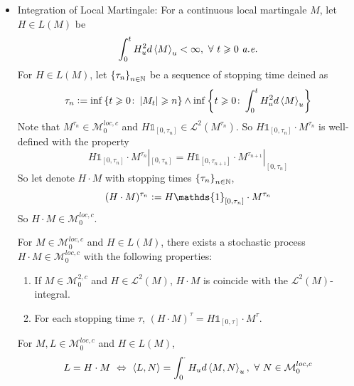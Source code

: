 \documentclass[a4paper,12pt]{article}
\begin{document}
\begin{itemize}
  \item Integration of Local Martingale: For a continuous local martingale $M$, let $H \in L(M)$ be
  \begin{equation*}
    \int_0^tH_u^2 d\left\langle M \right\rangle_u < \infty,~\forall~t\geqslant 0~\emph{a.e.}
  \end{equation*}
  For $H \in L(M)$, let $\left\{\tau_n\right\}_{n \in \mathbb{N}}$ be a sequence of stopping time deined as
  \begin{equation*}
    \tau_n \vcentcolon= \inf\left\{t \geqslant 0 \colon \left\lvert M_t\right\lvert \geqslant n\right\} \wedge \inf\left\{t \geqslant 0 \colon \int_0^t H_u^2 d\left\langle M \right\rangle_u\right\}
  \end{equation*}
  Note that $M^{\tau_n} \in \mathcal{M}_0^{loc,c}$ and $H\mathds{1}_{[0,\tau_n]} \in \mathcal{L}^2(M^{\tau_n})$. So $H\mathds{1}_{[0,\tau_n]} \cdot M^{\tau_n}$ is well-defined with the property
  \begin{equation*}
    H\mathds{1}_{[0,\tau_n]} \cdot M^{\tau_n}|_{[0,\tau_n]} = H\mathds{1}_{[0,\tau_{n+1}]} \cdot M^{\tau_{n+1}}|_{[0,\tau_n]}
  \end{equation*}
  So let denote $H \cdot M$ with stopping times $\left\{\tau_n\right\}_{n \in \mathbb{N}}$,
  \begin{equation*}
    (H \cdot M)^{\tau_n} \defeq H\mathds{1}_{[0,\tau_n]} \cdot M^{\tau_n}
  \end{equation*}
  So $H \cdot M \in \mathcal{M}_0^{loc,c}$.

  \begin{thm}
    For $M \in \mathcal{M}_0^{loc,c}$ and $H \in L(M)$, there exists a stochastic process $H \cdot M \in \mathcal{M}_0^{loc,c}$ with the following properties:
    \begin{enumerate}[label=(\arabic*)]
      \item If $M \in \mathcal{M}_0^{2,c}$ and $H \in \mathcal{L}^2(M)$, $H \cdot M$ is coincide with the $\mathcal{L}^2(M)$-integral.
      \item For each stopping time $\tau$, $(H \cdot M)^{\tau} =  H\mathds{1}_{[0,\tau]} \cdot M^{\tau}$.
    \end{enumerate}
  \end{thm}

  \begin{prop}
    For $M,L \in \mathcal{M}_0^{loc,c}$ and $H \in L(M)$,
    \begin{equation*}
      L = H \cdot M ~\Leftrightarrow~ \left\langle L,N \right\rangle = \int_0^{\cdot}H_u d \left\langle M,N \right\rangle_u,~\forall~N \in \mathcal{M}_0^{loc,c}
    \end{equation*}
  \end{prop}


\end{itemize}
\end{document}
